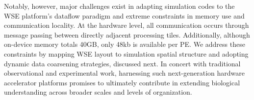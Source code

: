 Notably, however, major challenges exist in adapting simulation codes to the WSE platform's dataflow paradigm and extreme constraints in memory use and communication locality.
At the hardware level, all communication occurs through message passing between directly adjacent processing tiles.
Additionally, although on-device memory totals 40GB, only 48kb is available per PE.
We address these constraints by mapping WSE layout to simulation spatial structure and adopting dynamic data coarsening strategies, discussed next.
In concert with traditional observational and experimental work, harnessing such next-generation hardware accelerator platforms promises to ultimately contribute in extending biological understanding across broader scales and levels of organization.







